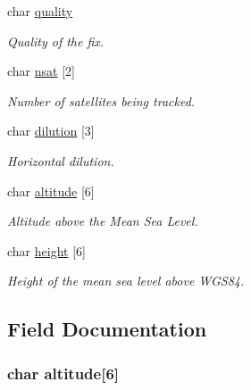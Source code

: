 \begin{DoxyCompactItemize}
char \hyperlink{struct_g_p_s___d_a_t_a___type_def_aea980c6e93a4a64525288098e722052b}{quality}
\begin{DoxyCompactList}\small\item\em Quality of the fix. \end{DoxyCompactList}\item 
char \hyperlink{struct_g_p_s___d_a_t_a___type_def_a08c6ad522733495f34228963dae478d8}{nsat} \mbox{[}2\mbox{]}
\begin{DoxyCompactList}\small\item\em Number of satellites being tracked. \end{DoxyCompactList}\item 
char \hyperlink{struct_g_p_s___d_a_t_a___type_def_a2491d00abb2a6cd0c1c201c9c2565c78}{dilution} \mbox{[}3\mbox{]}
\begin{DoxyCompactList}\small\item\em Horizontal dilution. \end{DoxyCompactList}\item 
char \hyperlink{struct_g_p_s___d_a_t_a___type_def_a80b6084773408d40588c2e85d874771b}{altitude} \mbox{[}6\mbox{]}
\begin{DoxyCompactList}\small\item\em Altitude above the Mean Sea Level. \end{DoxyCompactList}\item 
char \hyperlink{struct_g_p_s___d_a_t_a___type_def_a828fc6b85cb0c19688e63b27b6170741}{height} \mbox{[}6\mbox{]}
\begin{DoxyCompactList}\small\item\em Height of the mean sea level above W\+G\+S84. \end{DoxyCompactList}\end{DoxyCompactItemize}


\subsection{Field Documentation}
\hypertarget{struct_g_p_s___d_a_t_a___type_def_a80b6084773408d40588c2e85d874771b}{}
\subsubsection[{altitude}]{\setlength{\rightskip}{0pt plus 5cm}char altitude\mbox{[}6\mbox{]}}\label{struct_g_p_s___d_a_t_a___type_def_a80b6084773408d40588c2e85d874771b}


